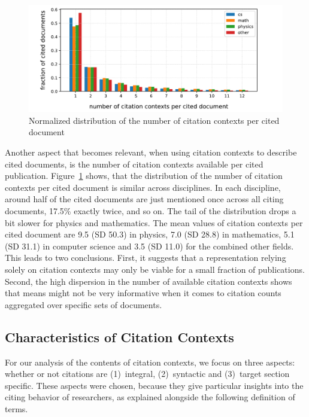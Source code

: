 \begin{figure}
  \centering
    \includegraphics[width=\textwidth]{figures/corpus/Fig8.pdf}
  \caption{Normalized distribution of the number of citation contexts per cited document}
  \label{fig:citcontextdist}
\end{figure}

Another aspect that becomes relevant, when using citation contexts to describe cited documents, is the number of citation contexts available per cited publication. Figure~\ref{fig:citcontextdist} shows, that the distribution of the number of citation contexts per cited document is similar across disciplines. In each discipline, around half of the cited documents are just mentioned once across all citing documents, 17.5\% exactly twice, and so on. The tail of the distribution drops a bit slower for physics and mathematics. The mean values of citation contexts per cited document are 9.5 (SD 50.3) in physics, 7.0 (SD 28.8) in mathematics, 5.1 (SD 31.1) in computer science and 3.5 (SD 11.0) for the combined other fields. This leads to two conclusions. First, it suggests that a representation relying solely on citation contexts may only be viable for a small fraction of publications. Second, the high dispersion in the number of available citation contexts shows that means might not be very informative when it comes to citation counts aggregated over specific sets of documents.

\subsection{Characteristics of Citation Contexts}
For our analysis of the contents of citation contexts, we focus on three aspects: whether or not citations are (1)~integral, (2)~syntactic and (3)~target section specific. These aspects were chosen, because they give particular insights into the citing behavior of researchers, as explained alongside the following definition of terms.

